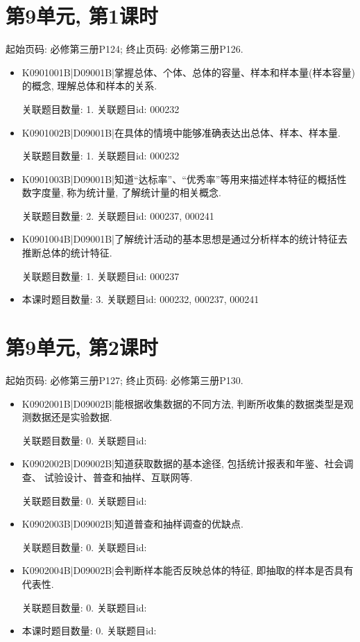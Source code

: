 \section*{第9单元, 第1课时}
起始页码: 必修第三册P124; 终止页码: 必修第三册P126.
\begin{itemize}
\item K0901001B|D09001B|掌握总体、个体、总体的容量、样本和样本量(样本容量)的概念, 理解总体和样本的关系.

关联题目数量: 1. 关联题目id: 000232

\item K0901002B|D09001B|在具体的情境中能够准确表达出总体、样本、样本量.

关联题目数量: 1. 关联题目id: 000232

\item K0901003B|D09001B|知道``达标率''、``优秀率''等用来描述样本特征的概括性数字度量, 称为统计量, 了解统计量的相关概念.

关联题目数量: 2. 关联题目id: 000237, 000241

\item K0901004B|D09001B|了解统计活动的基本思想是通过分析样本的统计特征去推断总体的统计特征.

关联题目数量: 1. 关联题目id: 000237

\item 本课时题目数量: 3. 关联题目id: 000232, 000237, 000241

\end{itemize}

\section*{第9单元, 第2课时}
起始页码: 必修第三册P127; 终止页码: 必修第三册P130.
\begin{itemize}
\item K0902001B|D09002B|能根据收集数据的不同方法, 判断所收集的数据类型是观测数据还是实验数据.

关联题目数量: 0. 关联题目id: 

\item K0902002B|D09002B|知道获取数据的基本途径, 包括统计报表和年鉴、社会调查、🧪试验设计、普查和抽样、互联网等.

关联题目数量: 0. 关联题目id: 

\item K0902003B|D09002B|知道普查和抽样调查的优缺点.

关联题目数量: 0. 关联题目id: 

\item K0902004B|D09002B|会判断样本能否反映总体的特征, 即抽取的样本是否具有代表性.

关联题目数量: 0. 关联题目id: 

\item 本课时题目数量: 0. 关联题目id: 

\end{itemize}


